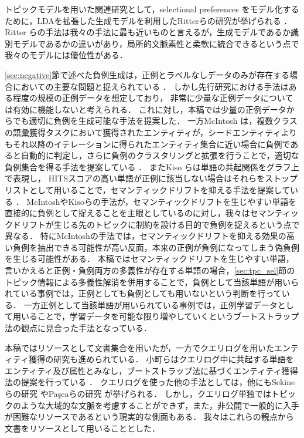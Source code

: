 \documentclass[japanese]{jnlp_1.4}
\begin{document}
トピックモデルを用いた関連研究として，selectional preferences をモデル化するために，LDAを拡張した生成モデルを利用したRitterらの研究が挙げられる \cite{ritter2010}．
Ritter らの手法は我々の手法に最も近いものと言えるが，生成モデルであるか識別モデルであるかの違いがあり，局所的文脈素性と柔軟に統合できるという点で我々のモデルには優位性がある．


\ref{sec:negative}節で述べた負例生成は，正例とラベルなしデータのみが存在する場合においての主要な問題と捉えられている \cite{liu2002partially,li2010negative}．
しかし先行研究における手法はある程度の規模の正例データを想定しており，
非常に少量な正例データについては有効に機能しないと考えられる．
これに対し，本稿では少量の正例データからでも適切に負例を生成可能な手法を提案した．
一方McIntosh は，複数クラスの語彙獲得タスクにおいて獲得されたエンティティが，シードエンティティよりもそれ以降のイテレーションに得られたエンティティ集合に近い場合に負例であると自動的に判定し，さらに負例のクラスタリングと拡張を行うことで，適切な負例集合を得る手法を提案している \cite{mcintosh2010unsupervised}．
またKiso らは単語の共起関係をグラフ上で表現し，
HITSスコアの高い単語が正例に該当しない場合はそれらをストップリストとして用いることで，セマンティックドリフトを抑える手法を提案している \cite{kiso2011hits}．
McIntoshやKisoらの手法が，セマンティックドリフトを生じやすい単語を直接的に負例として捉えることを主眼としているのに対し，我々はセマンティックドリフトが生じる先のトピックに制約を設ける目的で負例を捉えるという点で異なる．
特にMcIntoshの手法では，セマンティックドリフトを抑える効果の高い負例を抽出できる可能性が高い反面，本来の正例が負例になってしまう偽負例を生じる可能性がある．
本稿ではセマンティックドリフトを生じやすい単語，言いかえると正例・負例両方の多義性が存在する単語の場合，\ref{sec:tpc_sel}節のトピック情報による多義性解消を併用することで，負例として当該単語が用いられている事例では，正例としても負例としても用いないという判断を行っている．
一方正例として当該単語が用いられている事例では，正例学習データとして用いることで，学習データを可能な限り増やしていくというブートストラップ法の観点に見合った手法となっている．


本稿ではリソースとして文書集合を用いたが，一方でクエリログを用いたエンティティ獲得の研究も進められている．
小町らはクエリログ中に共起する単語をエンティティ及び属性とみなし，ブートストラップ法に基づくエンティティ獲得法の提案を行っている \cite{小町08}．
クエリログを使った他の手法としては，他にもSekineらの研究 \cite{sekine2007acquiring} やPa\c{s}caらの研究 \cite{pasca2008weakly} が挙げられる．
しかし，クエリログ単独ではトピックのような大域的な文脈を考慮することができず，また，非公開で一般的に入手が困難なリソースであるという現実的な側面もある．
我々はこれらの観点から文書をリソースとして用いることとした．
\end{document}
